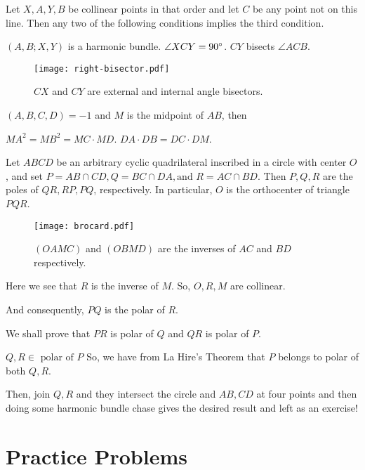 \begin{lemma}
Let $X,A,Y,B$ be collinear points in that order and let $C$ be any point not on this line. Then any two of the following conditions implies the third condition.
\begin{enumerate}[i]
	\ii $(A,B;X,Y)$ is a harmonic bundle.
	\ii $\angle XCY=90^\circ$.
	\ii $CY$ bisects $\angle ACB$.
\end{enumerate}
\end{lemma}

\begin{figure}[h!t]
\centering
	\texttt{[image: right-bisector.pdf]}%
	\caption{$CX$ and $CY$ are external and internal angle bisectors.}
\end{figure}

\begin{lemma}
$(A,B,C,D)=-1$ and $M$ is the midpoint of $AB$, then 
\begin{itemize}
	\ii $MA^2=MB^2=MC\cdot MD$.
	\ii $DA\cdot DB = DC \cdot DM$.
\end{itemize}
\end{lemma}


\begin{theorem}
Let $ABCD$ be an arbitrary cyclic quadrilateral
inscribed in a circle with center $O$, and set $P = AB \cap CD, Q = BC \cap DA, \text{and } R =
AC \cap BD.$ Then $P , Q, R$ are the poles of $QR, RP , P Q$, respectively.
In particular, $O$ is the orthocenter of triangle $PQR$.
\end{theorem}
\begin{figure}[h!t]
\centering
	\texttt{[image: brocard.pdf]}
	\caption{$(OAMC)$ and $(OBMD)$ are the inverses of $AC$ and $BD$ respectively.}
\end{figure}

Here we see that $R$ is the inverse of $M$. So, $O,R,M$ are collinear. 

And consequently, $PQ$ is the polar of $R$.

We shall prove that $PR$ is polar of $Q$ and $QR$ is polar of $P$.

$Q,R\in \text{ polar of }P$
So, we have from La Hire's Theorem that $P$ belongs to polar of both $Q,R$.

Then, join $Q,R$ and they intersect the circle and $AB,CD$ at four points and then doing some harmonic bundle chase gives the desired result and left as an exercise!

\section{Practice Problems}


